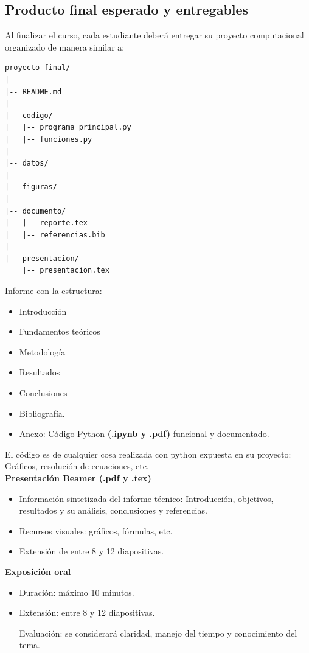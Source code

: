 \documentclass[12pt,letterpaper]{article}
\begin{document}
\subsection{Producto final esperado y entregables}

Al finalizar el curso, cada estudiante deberá entregar su proyecto computacional organizado de manera similar a:

\begin{verbatim}
proyecto-final/
|
|-- README.md
|
|-- codigo/
|   |-- programa_principal.py
|   |-- funciones.py
|
|-- datos/
|
|-- figuras/
|
|-- documento/
|   |-- reporte.tex
|   |-- referencias.bib
|
|-- presentacion/
    |-- presentacion.tex
\end{verbatim}


Informe con la estructura: 
\begin{itemize}[noitemsep]
    \item Introducción
        \item Fundamentos teóricos 
        \item Metodología 
        \item Resultados
        \item Conclusiones
        \item Bibliografía.
         \item Anexo: Código Python \textbf{(.ipynb y .pdf)} funcional y documentado.
    \end{itemize}
    
El código es de cualquier cosa realizada con python expuesta en su proyecto: Gráficos, resolución de ecuaciones, etc.\\


 \textbf{Presentación Beamer (.pdf y .tex)}\vspace{-2ex}
    \begin{itemize}[noitemsep]
        \item Información sintetizada del informe técnico: Introducción, objetivos, resultados y su análisis, conclusiones y referencias.
        \item Recursos visuales: gráficos, fórmulas, etc. 
        \item Extensión de entre 8 y 12 diapositivas.
    \end{itemize}
    
\textbf{Exposición oral}\vspace{-2ex}

\begin{itemize}[noitemsep]
\item Duración: máximo 10 minutos.
\item Extensión: entre 8 y 12 diapositivas.

Evaluación: se considerará claridad, manejo del tiempo y conocimiento del tema.
\end{itemize}
\end{document}
